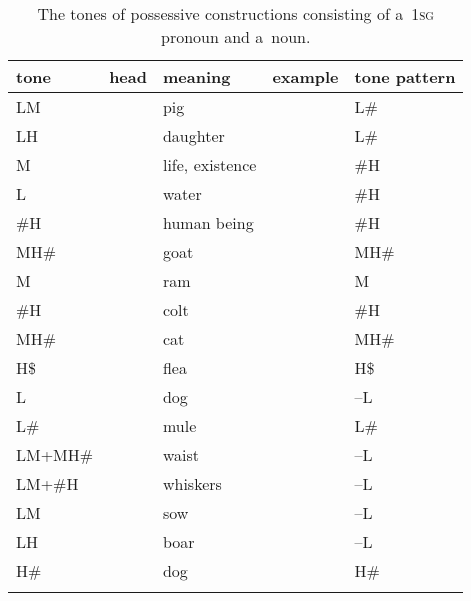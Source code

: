 \begin{table}%
\caption{\label{tab:thetonesofpossessiveconstructionsconsistingofa1sgpronounandanoun}The tones of {possessive} constructions consisting of a~1\textsc{sg} pronoun and a~noun.}
\begin{tabularx}{\textwidth}{ Q Q P{25mm} l l }
\lsptoprule
	tone & head & meaning & example & tone pattern\\ \midrule
	LM &  & pig &  & L\#\\
	LH &  & daughter &  & L\#\\
	M &  & life, existence &  & \#H\\
	L &  & water &  & \#H\\
	\#H &  & human being &  & \#H\\
	MH\# &  & goat &  & MH\#\\ \addlinespace \hdashline \addlinespace
	M &  & ram &  & M\\
	\#H &  & colt &  & \#H\\
	MH\# &  & cat &  & MH\#\\
	H\$ &  & flea &  & H\$\\
	L &  & dog &  & --L\\
	L\# &  & mule &  & L\#\\
	LM+MH\# &  & waist &  & --L\\
	LM+\#H &  & whiskers &  & --L\\
	LM &  & sow &  & --L\\
	LH &  & boar &  & --L\\
	H\# &  & dog &  & H\#\\
\lspbottomrule
\end{tabularx}
\end{table}

